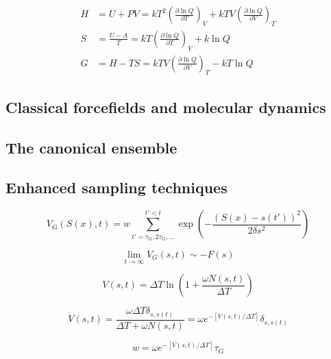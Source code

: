 \begin{align}
H &= U + PV = kT^2\left(\frac{\partial \ln Q}{\partial T}\right)_V + kTV\left(\frac{\partial \ln Q}{\partial V}\right)_T \tag{14.21} \\
S &= \frac{U-A}{T} = kT\left(\frac{\partial \ln Q}{\partial T}\right)_V + k\ln Q \\
G &= H - TS = kTV\left(\frac{\partial \ln Q}{\partial V}\right)_T - kT\ln Q
\end{align}

\subsection{Classical forcefields and molecular dynamics}

\subsection{The canonical ensemble}

\subsection{Enhanced sampling techniques}

\begin{equation}
V_{\text{G}}(S(x), t) = w \sum_{t' = \tau_{\text{G}}, 2\tau_{\text{G}}, \ldots}^{t' < t} \exp\left(-\frac{(S(x) - s(t'))^2}{2\delta s^2}\right)
\label{eq:biasing_potential}
\end{equation}

\begin{equation}
\label{eq:free_energy_from_metadynamics}
\lim_{t \to \infty} V_G(s,t) \sim -F(s)
\end{equation}

\begin{equation}
V(s, t) = \Delta T \ln\left(1 + \frac{\omega N(s, t)}{\Delta T}\right)
\label{eq:history_dependant_potential}
\end{equation}

\begin{equation}
\label{eq:hill_deposition_rate}
\dot{V}(s,t) = \frac{\omega \Delta T \delta_{s,s(t)}}{\Delta T + \omega N(s,t)} 
= \omega e^{-[V(s,t)/\Delta T]} \delta_{s,s(t)}
\end{equation}

\begin{equation}
w = \omega e^{-[V(s,t)/\Delta T]} \tau_{\text{G}}
\label{eq:hill_height}
\end{equation}

